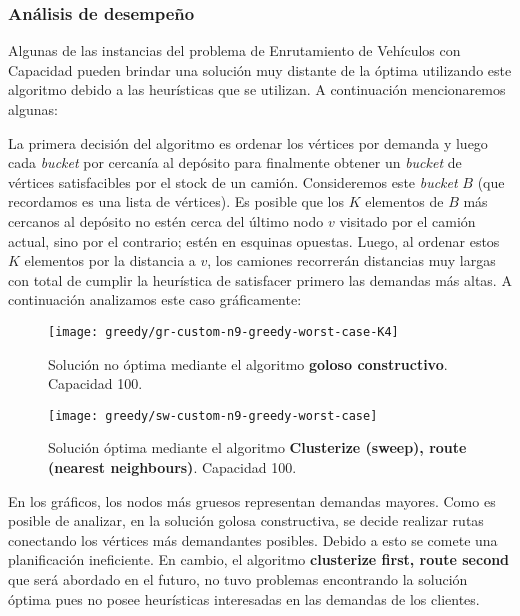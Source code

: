 \subsubsection{Análisis de desempeño}
Algunas de las instancias del problema de Enrutamiento de Vehículos con Capacidad pueden brindar una solución muy distante de la óptima utilizando este algoritmo debido a las heurísticas que se utilizan. A continuación mencionaremos algunas:

La primera decisión del algoritmo es ordenar los vértices por demanda y luego cada \textit{bucket} por cercanía al depósito para finalmente obtener un \textit{bucket} de vértices satisfacibles por el stock de un camión. Consideremos este \textit{bucket} $B$ (que recordamos es una lista de vértices). Es posible que los $K$ elementos de $B$ más cercanos al depósito no estén cerca del último nodo $v$ visitado por el camión actual, sino por el contrario; estén en esquinas opuestas. Luego, al ordenar estos $K$ elementos por la distancia a $v$, los camiones recorrerán distancias muy largas con total de cumplir la heurística de satisfacer primero las demandas más altas. A continuación analizamos este caso gráficamente:

\begin{figure}[H]
	\centering
	\begin{minipage}{0.48\textwidth}
		\centering
		\texttt{[image: greedy/gr-custom-n9-greedy-worst-case-K4]}
		\caption{\footnotesize Solución no óptima mediante el algoritmo \textbf{goloso constructivo}. Capacidad 100.}
		\label{fig:sa-custom-n9-greedy-worst-case-K4}
	\end{minipage}%
	\hspace{0.03\textwidth}
	\begin{minipage}{0.48\textwidth}
		\centering
		\texttt{[image: greedy/sw-custom-n9-greedy-worst-case]}
		\caption{\footnotesize Solución óptima mediante el algoritmo \textbf{Clusterize (sweep), route (nearest neighbours)}. Capacidad 100.}
		\label{fig:sw-custom-n9-greedy-worst-case-K4}
	\end{minipage}%
\end{figure}

En los gráficos, los nodos más gruesos representan demandas mayores. Como es posible de analizar, en la solución golosa constructiva, se decide realizar rutas conectando los vértices más demandantes posibles. Debido a esto se comete una planificación ineficiente. En cambio, el algoritmo \textbf{clusterize first, route second} que será abordado en el futuro, no tuvo problemas encontrando la solución óptima pues no posee heurísticas interesadas en las demandas de los clientes.

